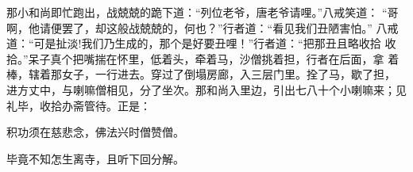 那小和尚即忙跑出，战兢兢的跪下道：“列位老爷，唐老爷请哩。”八戒笑道：
“哥啊，他请便罢了，却这般战兢兢的，何也？”行者道：“看见我们丑陋害怕。”
八戒道：“可是扯淡!我们乃生成的，那个是好要丑哩！”行者道：“把那丑且略收拾
收拾。”呆子真个把嘴揣在怀里，低着头，牵着马，沙僧挑着担，行者在后面，拿
着棒，辖着那女子，一行进去。穿过了倒塌房廊，入三层门里。拴了马，歇了担，
进方丈中，与喇嘛僧相见，分了坐次。那和尚入里边，引出七八十个小喇嘛来；见
礼毕，收拾办斋管待。正是：

积功须在慈悲念，佛法兴时僧赞僧。

毕竟不知怎生离寺，且听下回分解。